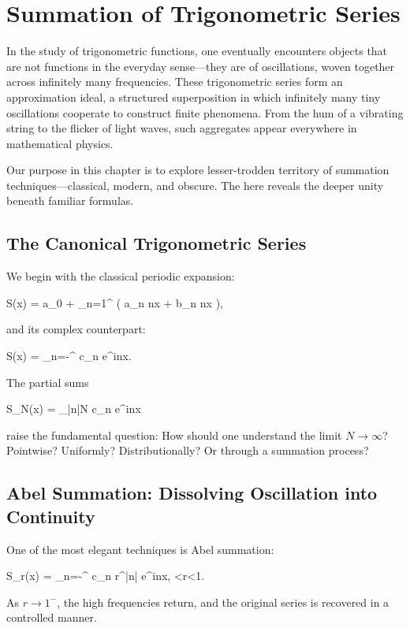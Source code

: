 \chapter{Summation of Trigonometric Series}

In the study of trigonometric functions, one eventually encounters objects
that are not functions in the everyday sense---they are 
of oscillations, woven together across infinitely many frequencies.
These trigonometric series form an approximation ideal, a structured
superposition in which infinitely many tiny oscillations cooperate to
construct finite phenomena. From the hum of a vibrating string to the flicker
of light waves, such aggregates appear everywhere in mathematical physics.

Our purpose in this chapter is to explore lesser-trodden territory of
summation techniques—classical, modern, and obscure. The  here reveals the deeper unity beneath familiar formulas.

\section{The Canonical Trigonometric Series}

We begin with the classical periodic expansion:

\startformula
S(x) = a_0 + \sum_{n=1}^{\infty} \bigl( a_n \cos nx + b_n \sin nx \bigr),
\stopformula

and its complex counterpart:

\startformula
S(x) = \sum_{n=-\infty}^{\infty} c_n e^{inx}.
\stopformula

The partial sums

\startformula
S_N(x) = \sum_{|n|\le N} c_n e^{inx}
\stopformula

raise the fundamental question: How should one understand the limit
$N\to\infty$? Pointwise? Uniformly? Distributionally? Or through a
summation process?

\section{Abel Summation: Dissolving Oscillation into Continuity}

One of the most elegant techniques is Abel summation:

\startformula
S_r(x) = \sum_{n=-\infty}^{\infty} c_n r^{|n|} e^{inx}, <r<1.
\stopformula

As $r\to 1^{-}$, the high frequencies return, and the original series is
recovered in a controlled manner.

